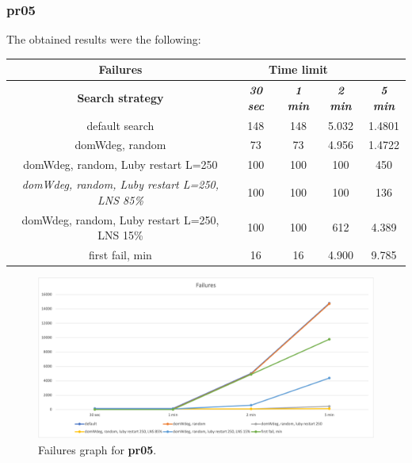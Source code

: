 \subsubsection{pr05}
The obtained results were the following:
{
\renewcommand{\arraystretch}{2}
\begin{longtable}[h]{| c | c | c | c | c |}
    \hline
    \textbf{Failures} & \multicolumn{3}{c}{Time limit} & \\
    \hline
    \textbf{Search strategy} & \textbf{\textit{30 sec}} & \textbf{\textit{1 min}} & \textbf{\textit{2 min}} & \textbf{\textit{5 min}} \\
    \hline
    \endhead
    default search                                         & 148 &  148 &  5.032 &  1.4801 \\
    \hline
    domWdeg, random                                        &  73 &   73 &  4.956 &  1.4722 \\
    \hline
    domWdeg, random, Luby restart L=250                    & 100 &  100 &   100 &    450 \\
    \hline
    \textit{domWdeg, random, Luby restart L=250, LNS 85\%} & 100 &  100 &   100 &    136 \\
    \hline
    domWdeg, random, Luby restart L=250, LNS 15\%          & 100 &  100 &   612 &   4.389 \\
    \hline
    first fail, min                                        &  16 &   16 &  4.900 &   9.785 \\
    \hline
\end{longtable}
}
\begin{figure}[H]
    \centering
    \includegraphics[width=0.8\columnwidth]{../graphs/pr05-failures.png}
    \caption{Failures graph for \textbf{pr05}.}
\end{figure}

